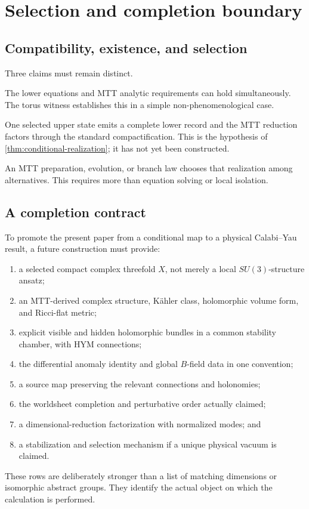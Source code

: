 \documentclass[11pt]{article}
\theoremstyle{definition}
\theoremstyle{remark}
\begin{document}
\section{Selection and completion boundary}
\label{sec:boundary}

\subsection{Compatibility, existence, and selection}

Three claims must remain distinct.
\begin{description}[leftmargin=2.7cm,style=nextline]
\item[Compatibility]
The lower equations and MTT analytic requirements can hold simultaneously.
The torus witness establishes this in a simple non-phenomenological case.

\item[Realization]
One selected upper state emits a complete lower record and the MTT reduction
factors through the standard compactification.  This is the hypothesis of
\cref{thm:conditional-realization}; it has not yet been constructed.

\item[Selection]
An MTT preparation, evolution, or branch law chooses that realization among
alternatives.  This requires more than equation solving or local isolation.
\end{description}

\subsection{A completion contract}

To promote the present paper from a conditional map to a physical
Calabi--Yau result, a future construction must provide:
\begin{enumerate}[leftmargin=1.7em]
\item a selected compact complex threefold \(X\), not merely a local
      \(SU(3)\)-structure ansatz;
\item an MTT-derived complex structure, K\"ahler class, holomorphic volume
      form, and Ricci-flat metric;
\item explicit visible and hidden holomorphic bundles in a common stability
      chamber, with HYM connections;
\item the differential anomaly identity and global \(B\)-field data in one
      convention;
\item a source map preserving the relevant connections and holonomies;
\item the worldsheet completion and perturbative order actually claimed;
\item a dimensional-reduction factorization with normalized modes; and
\item a stabilization and selection mechanism if a unique physical vacuum is
      claimed.
\end{enumerate}
These rows are deliberately stronger than a list of matching dimensions or
isomorphic abstract groups.  They identify the actual object on which the
calculation is performed.
\end{document}
